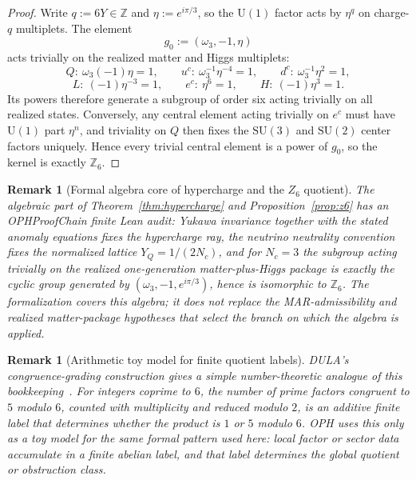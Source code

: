 \documentclass[11pt]{article}
\newtheorem{remark}[theorem]{Remark}
\newcommand{\SU}{\mathrm{SU}}
\newcommand{\U}{\mathrm{U}}
\begin{document}
\begin{proof}
Write $q:=6Y\in\mathbb Z$ and $\eta:=e^{i\pi/3}$, so the $\U(1)$ factor acts by $\eta^q$ on charge-$q$ multiplets. The element
\[
g_0:=(\omega_3,-1,\eta)
\]
acts trivially on the realized matter and Higgs multiplets:
\[
Q:\ \omega_3(-1)\eta=1,\qquad
u^c:\ \omega_3^{-1}\eta^{-4}=1,\qquad
d^c:\ \omega_3^{-1}\eta^2=1,
\]
\[
L:\ (-1)\eta^{-3}=1,\qquad
e^c:\ \eta^6=1,\qquad
H:\ (-1)\eta^3=1.
\]
Its powers therefore generate a subgroup of order six acting trivially on all realized states. Conversely, any central element acting trivially on $e^c$ must have $\U(1)$ part $\eta^n$, and triviality on $Q$ then fixes the $\SU(3)$ and $\SU(2)$ center factors uniquely. Hence every trivial central element is a power of $g_0$, so the kernel is exactly $\mathbb Z_6$.
\end{proof}

\begin{remark}[Formal algebra core of hypercharge and the \(Z_6\) quotient]
\label{rem:formal-hypercharge-z6-core}
The algebraic part of Theorem~\ref{thm:hypercharge} and
Proposition~\ref{prop:z6} has an OPHProofChain finite Lean audit: Yukawa invariance together
with the stated anomaly equations fixes the hypercharge ray, the neutrino
neutrality convention fixes the normalized lattice \(Y_Q=1/(2N_c)\), and for
\(N_c=3\) the subgroup acting trivially on the realized one-generation
matter-plus-Higgs package is exactly the cyclic group generated by
\((\omega_3,-1,e^{i\pi/3})\), hence is isomorphic to \(\mathbb Z_6\).  The
formalization covers this algebra; it does not replace the MAR-admissibility
and realized matter-package hypotheses that select the branch on which the
algebra is applied.
\end{remark}

\begin{remark}[Arithmetic toy model for finite quotient labels]
DULA's congruence-grading construction gives a simple number-theoretic analogue of this
bookkeeping~\cite{dula2025}. For integers coprime to \(6\), the number of prime factors
congruent to \(5\) modulo \(6\), counted with multiplicity and reduced modulo \(2\), is an
additive finite label that determines whether the product is \(1\) or \(5\) modulo \(6\). OPH uses
this only as a toy model for the same formal pattern used
here: local factor or sector data accumulate in a finite abelian label, and that label determines
the global quotient or obstruction class.
\end{remark}
\end{document}
